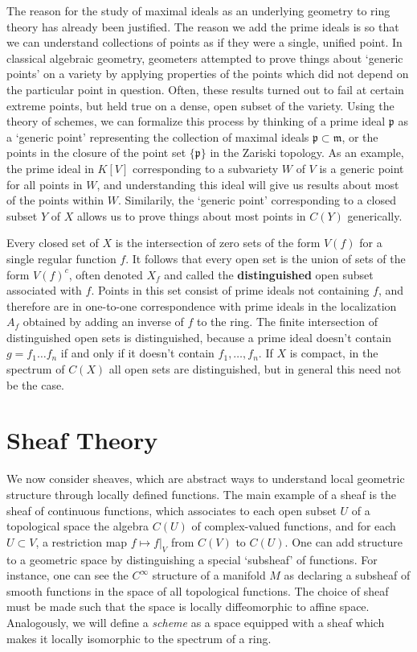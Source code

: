 The reason for the study of maximal ideals as an underlying geometry to ring theory has already been justified. The reason we add the prime ideals is so that we can understand collections of points as if they were a single, unified point. In classical algebraic geometry, geometers attempted to prove things about `generic points' on a variety by applying properties of the points which did not depend on the particular point in question. Often, these results turned out to fail at certain extreme points, but held true on a dense, open subset of the variety. Using the theory of schemes, we can formalize this process by thinking of a prime ideal $\mathfrak{p}$ as a `generic point' representing the collection of maximal ideals $\mathfrak{p} \subset \mathfrak{m}$, or the points in the closure of the point set $\{ \mathfrak{p} \}$ in the Zariski topology. As an example, the prime ideal in $K[V]$ corresponding to a subvariety $W$ of $V$ is a generic point for all points in $W$, and understanding this ideal will give us results about most of the points within $W$. Similarily, the `generic point' corresponding to a closed subset $Y$ of $X$ allows us to prove things about most points in $C(Y)$ generically.

Every closed set of $X$ is the intersection of zero sets of the form $V(f)$ for a single regular function $f$. It follows that every open set is the union of sets of the form $V(f)^c$, often denoted $X_f$ and called the {\bf distinguished} open subset associated with $f$. Points in this set consist of prime ideals not containing $f$, and therefore are in one-to-one correspondence with prime ideals in the localization $A_f$ obtained by adding an inverse of $f$ to the ring. The finite intersection of distinguished open sets is distinguished, because a prime ideal doesn't contain $g = f_1 \dots f_n$ if and only if it doesn't contain $f_1, \dots, f_n$. If $X$ is compact, in the spectrum of $C(X)$ all open sets are distinguished, but in general this need not be the case.

\section{Sheaf Theory}

We now consider sheaves, which are abstract ways to understand local geometric structure through locally defined functions. The main example of a sheaf is the sheaf of continuous functions, which associates to each open subset $U$ of a topological space the algebra $C(U)$ of complex-valued functions, and for each $U \subset V$, a restriction map $f \mapsto f|_V$ from $C(V)$ to $C(U)$. One can add structure to a geometric space by distinguishing a special `subsheaf' of functions. For instance, one can see the $C^\infty$ structure of a manifold $M$ as declaring a subsheaf of smooth functions in the space of all topological functions. The choice of sheaf must be made such that the space is locally diffeomorphic to affine space. Analogously, we will define a {\it scheme} as a space equipped with a sheaf which makes it locally isomorphic to the spectrum of a ring.

